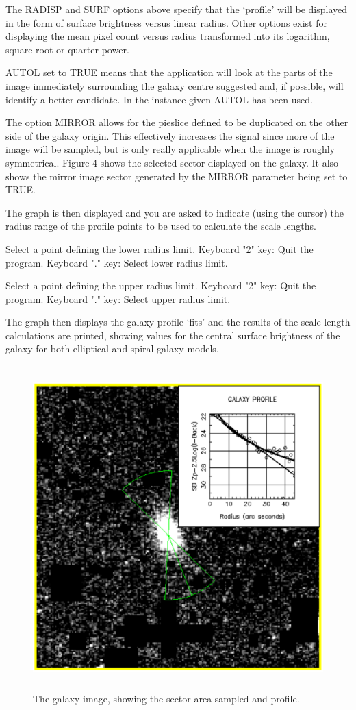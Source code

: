 \documentclass[twoside,11pt]{starlink}
\begin{document}
The RADISP and SURF options above specify that the `profile' will be displayed
in the form of surface brightness versus linear radius. Other options exist for
displaying the mean pixel count versus radius transformed into its
logarithm, square root or quarter power.

AUTOL set to TRUE means that the application will look at the parts of the
image immediately surrounding the galaxy centre suggested
and, if possible, will identify a better candidate. In the instance given
AUTOL has been used.

The option MIRROR allows for the pieslice
defined to be duplicated on the other side of the galaxy
origin. This effectively increases the signal since more of the image will be
sampled, but is only really applicable when the image is roughly
symmetrical. Figure 4 shows the selected sector displayed on the galaxy. It
also shows the mirror image sector generated by the MIRROR parameter being
set to TRUE.

The graph is then displayed and you are asked to indicate (using the cursor)
the radius range of the profile points to be used to calculate the scale
lengths.

\begin{terminalv}
Select a point defining the lower radius limit.
Keyboard "2" key:   Quit the program.
Keyboard "." key:   Select lower radius limit.

Select a point defining the upper radius limit.
Keyboard "2" key:   Quit the program.
Keyboard "." key:   Select upper radius limit.
\end{terminalv}

The graph then displays the galaxy profile `fits' and the
results of the scale length calculations are printed, showing
values for the central surface brightness of the galaxy for both elliptical
and spiral galaxy models.

\begin{figure}[htlb]
\centering
\includegraphics[height=125mm,width=125mm]{sun180_diag4}
\caption{The galaxy image, showing the sector area sampled and profile.}
\end{figure}
\end{document}

